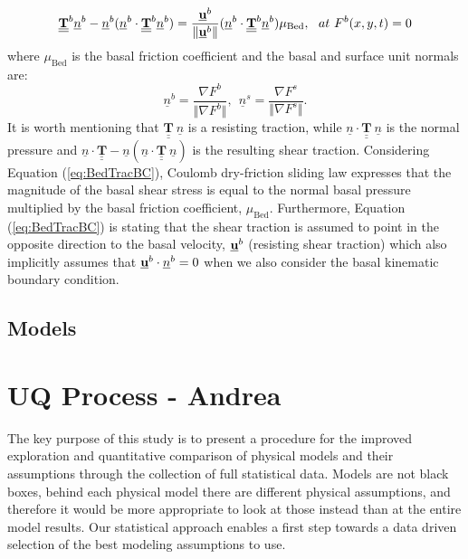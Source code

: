 \documentclass{article}
\begin{document}
\begin{equation}\label{eq:BedTracBC}
\underline{\underline{{\mathbf{T}}}}^b\underline{n}^b-\underline{n}^b(\underline{n}^b\cdot \underline{\underline{{\mathbf{T}}}}^b\underline{n}^b)=\frac{\underline{{\textbf u}}^b}{\Vert\underline{{\textbf u}}^b\Vert}(\underline{n}^b\cdot \underline{\underline{{\mathbf{T}}}}^b\underline{n}^b)\mu_{\mathrm{Bed}}, \ \ at \ F^b(x,y,t)=0
\end{equation}
where $\mu_{\mathrm{Bed}}$ is the basal friction coefficient and the basal and surface unit normals are:
\begin{equation}
\underline{n}^b=\frac{\nabla F^b}{\Vert\nabla F^b\Vert}, \ \ \underline{n}^s=\frac{\nabla F^s}{\Vert\nabla F^s\Vert}.
\end{equation}
It is worth mentioning that $\underline{\underline{{\mathbf{T}}}} \ \underline{n}$ is a resisting traction, while $\underline{n}\cdot\underline{\underline{{\mathbf{T}}}} \ \underline{n}$ is the normal pressure and $\underline{n}\cdot\underline{\underline{{\mathbf{T}}}}-\underline{n}(\underline{n}\cdot\underline{\underline{{\mathbf{T}}}} \ \underline{n})$ is the resulting shear traction. Considering Equation (\ref{eq:BedTracBC}), Coulomb dry-friction sliding law expresses that the magnitude of the basal shear stress is equal to the normal basal pressure multiplied by the basal friction coefficient, $\mu_{\mathrm{Bed}}$. Furthermore, Equation (\ref{eq:BedTracBC}) is stating that the shear traction is assumed to point in the opposite direction to the basal velocity, $\underline{{\textbf u}}^b$ (resisting shear traction) which also implicitly assumes that $\underline{{\textbf u}}^b\cdot \underline{n}^b=0$ when we also consider the basal kinematic boundary condition.

\subsection{Models}\label{subsec:Models}

\section{UQ Process - Andrea}
The key purpose of this study is to present a procedure for the improved exploration and quantitative comparison of physical models and their assumptions through the collection of full statistical data. Models are not black boxes, behind each physical model there are different physical assumptions, and therefore it would be more appropriate to look at those instead than at the entire model results. Our statistical approach enables a first step towards a data driven selection of the best modeling assumptions to use.
\end{document}
